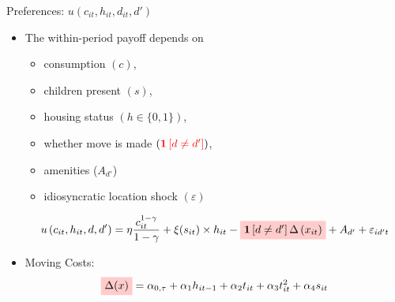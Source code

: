 \documentclass[12pt,english, aspectratio=169]{beamer}
\begin{document}
\begin{frame}{Preferences: $u(c_{it},h_{it},d_{it},d')$}
\begin{itemize}
\item The within-period payoff depends on 

\begin{itemize}
\item consumption $(c)$, 
\item children present $(s)$, 
\item housing status $(h\in\{0,1\})$, 
\item whether move is made \textrm{$\left({\color{red}{\mathbf{1}\left[d\neq d'\right]}}\right)$,}
\item amenities ($A_{d'}$)
\item idiosyncratic location shock $\left(\varepsilon\right)$
\end{itemize}
\[
u\left(c_{it},h_{it},d,d'\right)=\eta \frac{c_{it}^{1-\gamma}}{1-\gamma} + \xi(s_{it})\times h_{it} - 
\tikz[baseline]{
            \node[fill=red!20,anchor=base] (t1)
            {$ \mathbf{1}\left[d\neq d'\right]\Delta\left(x_{it}\right) $};
        } +A_{d'}+\varepsilon_{id't}
\]

\item Moving Costs:
\[
\tikz[baseline]{
            \node[fill=red!20,anchor=base] (t2)
            {$ \Delta(x)$};
            } = \alpha_{0,\tau} 
+\alpha_{1} h_{it-1}+\alpha_{2}t_{it}+\alpha_{3}t_{it}^{2}+\alpha_{4}s_{it}
\]

\end{itemize}
\end{frame}
\end{document}
